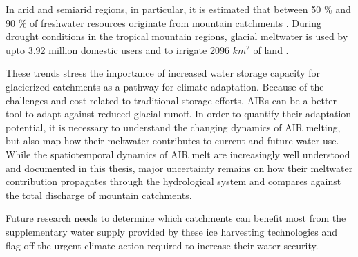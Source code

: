 In arid and semiarid regions, in particular, it is estimated that between 50 \% and 90 \% of freshwater
resources originate from mountain catchments \citep{messerliMountainsWorldVulnerable2004}. During drought
conditions in the tropical mountain regions, glacial meltwater is used by upto 3.92 million domestic users and
to irrigate 2096 $km^2$ of land \citep{buytaertGlacialMeltContent2017}.

These trends stress the importance of increased water storage capacity for glacierized catchments as a pathway
for climate adaptation. Because of the challenges and cost related to traditional storage efforts, AIRs can be
a better tool to adapt against reduced glacial runoff. In order to quantify their adaptation potential, it
is necessary to understand the changing dynamics of AIR melting, but also map how their meltwater contributes to
current and future water use. While the spatiotemporal dynamics of AIR melt are increasingly well understood and
documented in this thesis, major uncertainty remains on how their meltwater contribution propagates through the
hydrological system and compares against the total discharge of mountain catchments.

Future research needs to determine which catchments can benefit most from the supplementary water supply
provided by these ice harvesting technologies and flag off the urgent climate action required to increase their
water security.




